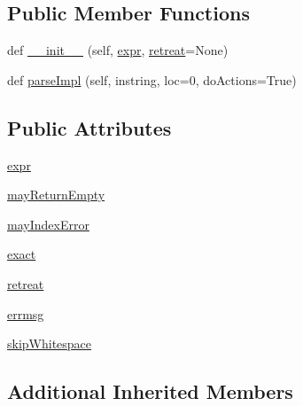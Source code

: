 \subsection*{Public Member Functions}
\begin{DoxyCompactItemize}
\item 
def \hyperlink{classpip_1_1__vendor_1_1pyparsing_1_1PrecededBy_ada68602a40af0ced9b88102e990fa4cc}{\+\_\+\+\_\+init\+\_\+\+\_\+} (self, \hyperlink{classpip_1_1__vendor_1_1pyparsing_1_1PrecededBy_a0242f9090585df6a04e5379effb4d54b}{expr}, \hyperlink{classpip_1_1__vendor_1_1pyparsing_1_1PrecededBy_a13e4d5545d5ee2d053ecf3a4dabbe2b5}{retreat}=None)
\item 
def \hyperlink{classpip_1_1__vendor_1_1pyparsing_1_1PrecededBy_ae318b266c7714d8defefe509c50cc548}{parse\+Impl} (self, instring, loc=0, do\+Actions=True)
\end{DoxyCompactItemize}
\subsection*{Public Attributes}
\begin{DoxyCompactItemize}
\item 
\hyperlink{classpip_1_1__vendor_1_1pyparsing_1_1PrecededBy_a0242f9090585df6a04e5379effb4d54b}{expr}
\item 
\hyperlink{classpip_1_1__vendor_1_1pyparsing_1_1PrecededBy_a170a8c9abd227171207b1e3f805a9abe}{may\+Return\+Empty}
\item 
\hyperlink{classpip_1_1__vendor_1_1pyparsing_1_1PrecededBy_aceb7b947a54ac42e3e32539c0940832c}{may\+Index\+Error}
\item 
\hyperlink{classpip_1_1__vendor_1_1pyparsing_1_1PrecededBy_ade011b2d64331e92a630c07d320f0c38}{exact}
\item 
\hyperlink{classpip_1_1__vendor_1_1pyparsing_1_1PrecededBy_a13e4d5545d5ee2d053ecf3a4dabbe2b5}{retreat}
\item 
\hyperlink{classpip_1_1__vendor_1_1pyparsing_1_1PrecededBy_a66d50d0e613d0ed5027903ca8bb8eedf}{errmsg}
\item 
\hyperlink{classpip_1_1__vendor_1_1pyparsing_1_1PrecededBy_a327cf02665b86210dc484eb569f50d24}{skip\+Whitespace}
\end{DoxyCompactItemize}
\subsection*{Additional Inherited Members}


